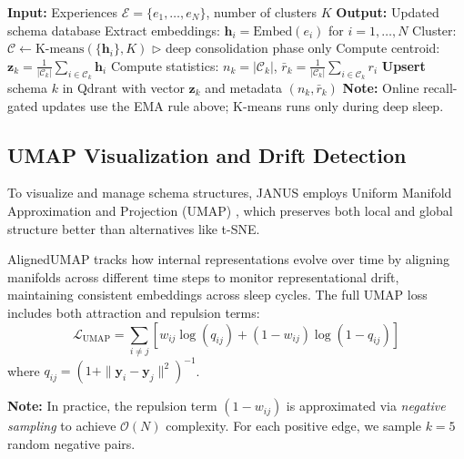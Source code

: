 \documentclass[12pt, a4paper]{article}
\makeatletter
\def\@{}%
\makeatother
\begin{document}
\begin{algorithm}[htbp]
	\caption{Schema Formation and Update}
	\label{alg:schema_update}
	\begin{algorithmic}[1]
		\State \textbf{Input:} Experiences $\mathcal{E} = \{e_1, \ldots, e_N\}$, number of clusters $K$
		\State \textbf{Output:} Updated schema database
		\State
		\State Extract embeddings: $\mathbf{h}_i = \text{Embed}(e_i)$ for $i = 1, \ldots, N$
		\State Cluster: $\mathcal{C} \leftarrow \text{K-means}(\{\mathbf{h}_i\}, K)$ \hfill $\triangleright$ deep consolidation phase only
			\State Compute centroid: $\mathbf{z}_k = \frac{1}{|\mathcal{C}_k|} \sum_{i \in \mathcal{C}_k} \mathbf{h}_i$
			\State Compute statistics: $n_k = |\mathcal{C}_k|$, $\bar{r}_k = \frac{1}{|\mathcal{C}_k|} \sum_{i \in \mathcal{C}_k} r_i$
			\State \textbf{Upsert} schema $k$ in Qdrant with vector $\mathbf{z}_k$ and metadata $(n_k, \bar{r}_k)$
		\EndFor
		\State \textbf{Note:} Online recall-gated updates use the EMA rule above; K-means runs only during deep sleep.
	\end{algorithmic}
\end{algorithm}

\subsection{UMAP Visualization and Drift Detection}
\label{sec:umap}

To visualize and manage schema structures, JANUS employs Uniform Manifold Approximation and Projection (UMAP) \citep{mcinnes2018umap}, which preserves both local and global structure better than alternatives like t-SNE\@.

AlignedUMAP \citep{mcinnes2018umap, mcinnes2018umap_software} tracks how internal representations evolve over time by aligning manifolds across different time steps to monitor representational drift, maintaining consistent embeddings across sleep cycles. The full UMAP loss includes both attraction and repulsion terms:
\begin{equation}
	\mathcal{L}_{\text{UMAP}} = \sum_{i \neq j} \left[
		w_{ij} \log(q_{ij}) + (1 - w_{ij}) \log(1 - q_{ij})
		\right]
\end{equation}
where $q_{ij} = {\left(1 + \|\mathbf{y}_i - \mathbf{y}_j\|^2\right)}^{-1}$.

\textbf{Note:} In practice, the repulsion term $(1 - w_{ij})$ is approximated via \emph{negative sampling} to achieve $\mathcal{O}(N)$ complexity. For each positive edge, we sample $k=5$ random negative pairs.
\end{document}

